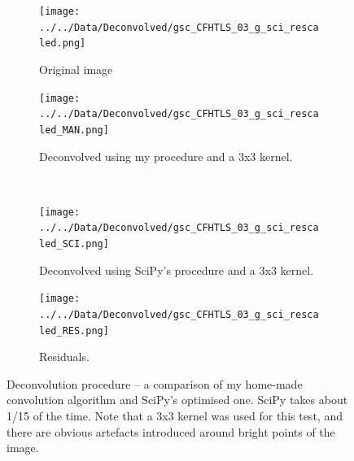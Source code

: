 \documentclass[letterpaper, 11pt]{article}
\begin{document}
\begin{figure}
	\def\width{0.3\textwidth}
	\centering
	\begin{subfigure}{\width}
		\texttt{[image: ../../Data/Deconvolved/gsc\_CFHTLS\_03\_g\_sci\_rescaled.png]}
		\caption{Original image}
	\end{subfigure}
	
	\begin{subfigure}{\width}
		\texttt{[image: ../../Data/Deconvolved/gsc\_CFHTLS\_03\_g\_sci\_rescaled\_MAN.png]}
		\caption{Deconvolved using my procedure and a 3x3 kernel.}
	\end{subfigure}
	~
	\begin{subfigure}{\width}
		\texttt{[image: ../../Data/Deconvolved/gsc\_CFHTLS\_03\_g\_sci\_rescaled\_SCI.png]}
		\caption{Deconvolved using SciPy's procedure and a 3x3 kernel.}
	\end{subfigure}
	
	\begin{subfigure}{\width}
		\texttt{[image: ../../Data/Deconvolved/gsc\_CFHTLS\_03\_g\_sci\_rescaled\_RES.png]}
		\caption{Residuals.}
	\end{subfigure}
	\caption{Deconvolution procedure -- a comparison of my home-made convolution algorithm and SciPy's optimised one. SciPy takes about 1/15 of the time. Note that a 3x3 kernel was used for this test, and there are obvious artefacts introduced around bright points of the image.}
	\label{fig:deconvolution_comparison}
\end{figure}


\newpage
{}


\end{document}
